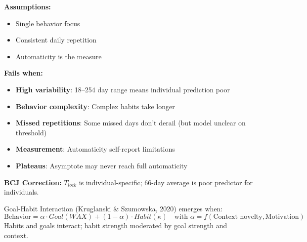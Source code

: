 \begin{tcolorbox}[colback=red!5!white, colframe=red!75!black, title=Boundary Condition: Where Habit Time Model Fails]
\textbf{Assumptions:}
\begin{itemize}[nosep]
\item Single behavior focus
\item Consistent daily repetition
\item Automaticity is the measure
\end{itemize}

\textbf{Fails when:}
\begin{itemize}[nosep]
\item \textbf{High variability}: 18--254 day range means individual prediction poor
\item \textbf{Behavior complexity}: Complex habits take longer
\item \textbf{Missed repetitions}: Some missed days don't derail (but model unclear on threshold)
\item \textbf{Measurement}: Automaticity self-report limitations
\item \textbf{Plateaus}: Asymptote may never reach full automaticity
\end{itemize}

\textbf{BCJ Correction:} $T_{lock}$ is individual-specific; 66-day average is poor predictor for individuals.
\end{tcolorbox}


\begin{theorem}
\label{thm:goal-habit}
Goal-Habit Interaction (Kruglanski \& Szumowska, 2020) emerges when:
\begin{equation}
\boxed{\text{Behavior} = \alpha \cdot Goal(WAX) + (1-\alpha) \cdot Habit(\kappa) \quad \text{with } \alpha = f(\text{Context novelty}, \text{Motivation})}
\end{equation}
Habits and goals interact; habit strength moderated by goal strength and context.
\end{theorem}

